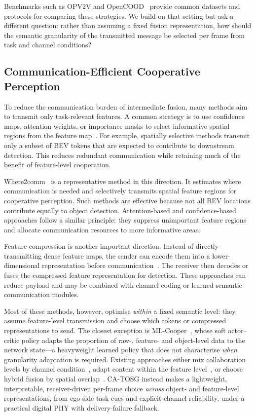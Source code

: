 \documentclass[journal]{IEEEtran}
\newcommand{\method}{CA-TOSG}
\begin{document}
Benchmarks such as OPV2V and OpenCOOD~\cite{xu2022opv2v} provide common datasets and protocols for comparing these strategies. We build on that setting but ask a different question: rather than assuming a fixed fusion representation, how should the semantic granularity of the transmitted message be selected per frame from task and channel conditions?

\subsection{Communication-Efficient Cooperative Perception}

To reduce the communication burden of intermediate fusion, many methods aim to transmit only task-relevant features. A common strategy is to use confidence maps, attention weights, or importance masks to select informative spatial regions from the feature map~\cite{hu2022where2comm,sheng2024importance}. For example, spatially selective methods transmit only a subset of BEV tokens that are expected to contribute to downstream detection. This reduces redundant communication while retaining much of the benefit of feature-level cooperation.

Where2comm~\cite{hu2022where2comm} is a representative method in this direction. It estimates where communication is needed and selectively transmits spatial feature regions for cooperative perception. Such methods are effective because not all BEV locations contribute equally to object detection. Attention-based and confidence-based approaches follow a similar principle: they suppress unimportant feature regions and allocate communication resources to more informative areas.

Feature compression is another important direction. Instead of directly transmitting dense feature maps, the sender can encode them into a lower-dimensional representation before communication~\cite{sheng2024importance}. The receiver then decodes or fuses the compressed feature representation for detection. These approaches can reduce payload and may be combined with channel coding or learned semantic communication modules.

Most of these methods, however, optimise \emph{within} a fixed semantic level: they assume feature-level transmission and choose which tokens or compressed representations to send. The closest exception is ML-Cooper~\cite{xie2022mlcooper}, whose soft actor--critic policy adapts the proportion of raw-, feature- and object-level data to the network state---a heavyweight learned policy that does not characterise \emph{when} granularity adaptation is required. Existing approaches either mix collaboration levels by channel condition~\cite{xie2022mlcooper}, adapt content within the feature level~\cite{hu2022where2comm,sheng2024importance}, or choose hybrid fusion by spatial overlap~\cite{liu2024rbh}. \method{} instead makes a lightweight, interpretable, receiver-driven per-frame choice \emph{across} object- and feature-level representations, from ego-side task cues and explicit channel reliability, under a practical digital PHY with delivery-failure fallback.
\end{document}
